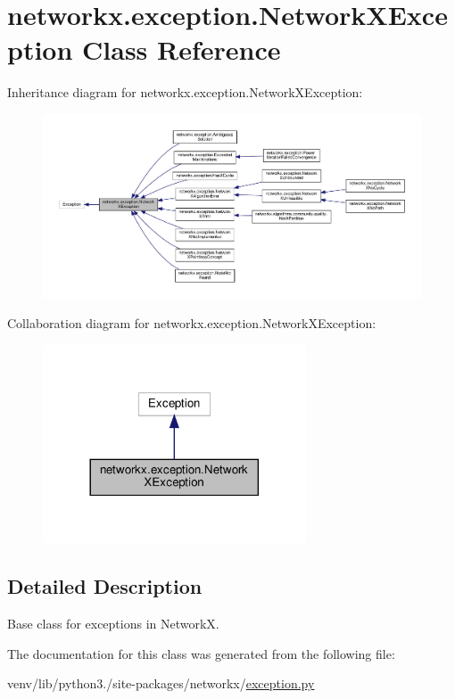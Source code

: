 \hypertarget{classnetworkx_1_1exception_1_1NetworkXException}{}\section{networkx.\+exception.\+Network\+X\+Exception Class Reference}
\label{classnetworkx_1_1exception_1_1NetworkXException}


Inheritance diagram for networkx.\+exception.\+Network\+X\+Exception\+:
\nopagebreak
\begin{figure}[H]
\begin{center}
\leavevmode
\includegraphics[width=350pt]{classnetworkx_1_1exception_1_1NetworkXException__inherit__graph}
\end{center}
\end{figure}


Collaboration diagram for networkx.\+exception.\+Network\+X\+Exception\+:
\nopagebreak
\begin{figure}[H]
\begin{center}
\leavevmode
\includegraphics[width=221pt]{classnetworkx_1_1exception_1_1NetworkXException__coll__graph}
\end{center}
\end{figure}


\subsection{Detailed Description}
\begin{DoxyVerb}Base class for exceptions in NetworkX.\end{DoxyVerb}
 

The documentation for this class was generated from the following file\+:\begin{DoxyCompactItemize}
\item 
venv/lib/python3./site-\/packages/networkx/\hyperlink{exception_8py}{exception.\+py}\end{DoxyCompactItemize}
